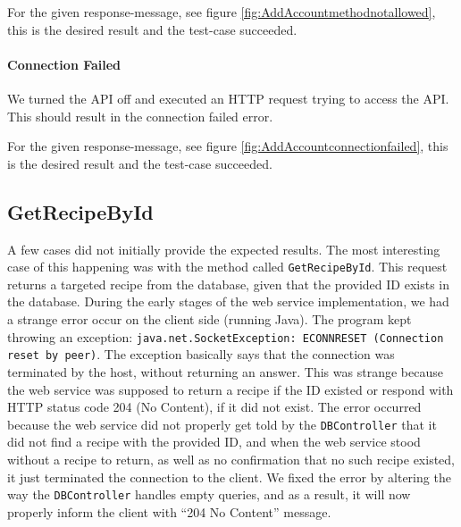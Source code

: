 For the given response-message, see figure \ref{fig:AddAccountmethodnotallowed}, this is the desired result and the test-case succeeded.

\paragraph{Connection Failed}
We turned the API off and executed an HTTP request trying to access the API. This should result in the connection failed error. 

For the given response-message, see figure \ref{fig:AddAccountconnectionfailed}, this is the desired result and the test-case succeeded.

\subsection{GetRecipeById}
A few cases did not initially provide the expected results. The most interesting case of this happening was with the method called \texttt{GetRecipeById}.
This request returns a targeted recipe from the database, given that the provided ID exists in the database. During the early stages of the web service implementation, we had a strange error occur on the client side (running Java). The program kept throwing an exception: \texttt{java.net.SocketException: ECONNRESET (Connection reset by peer)}\cite{socketexception}. The exception basically says that the connection was terminated by the host, without returning an answer. This was strange because the web service was supposed to return a recipe if the ID existed or respond with HTTP status code 204 (No Content), if it did not exist. The error occurred because the web service did not properly get told by the \texttt{DBController} that it did not find a recipe with the provided ID, and when the web service stood without a recipe to return, as well as no confirmation that no such recipe existed, it just terminated the connection to the client. We fixed the error by altering the way the \texttt{DBController} handles empty queries, and as a result, it will now properly inform the client with ``204 No Content'' message.


